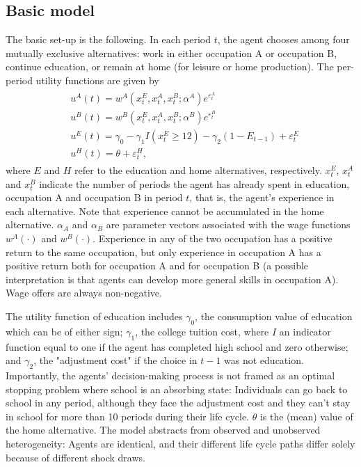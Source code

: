 \subsection{Basic model}

The basic set-up is the following. In each period $t$, the agent chooses among four mutually exclusive alternatives: work in either occupation A or occupation B, continue education, or remain at home (for leisure or home production). The per-period utility functions are given by
\begin{align} \label{eq:model-KW94}
\begin{split}
& u^A(t) = w^A(x^E_t, x^A_t, x^B_t; \alpha^A)e^{\varepsilon^A_t} \\
& u^B(t) = w^B(x^E_t, x^A_t, x^B_t;\alpha^B)e^{\varepsilon^B_t} \\
& u^E(t) = \gamma_0 - \gamma_1I(x^E_t \geq 12) - \gamma_2(1 - E_{t - 1}) + \varepsilon^E_t \\
& u^H(t) = \theta + \varepsilon^H_t,
\end{split}
\end{align}
where $E$ and $H$ refer to the education and home alternatives, respectively. $x^E_t$, $x^A_t$ and $x^B_t$ indicate the number of periods the agent has already spent in education, occupation A and occupation B in period $t$, that is, the agent's experience in each alternative. Note that experience cannot be accumulated in the home alternative. $\alpha_A$ and $\alpha_B$ are parameter vectors associated with the wage functions $w^A(\cdot)$ and $w^B(\cdot)$. Experience in any of the two occupation has a positive return to the same occupation, but only experience in occupation A has a positive return both for occupation A and for occupation B (a possible interpretation is that agents can develop more general skills in occupation A). Wage offers are always non-negative.

The utility function of education includes $\gamma_0$, the consumption value of education which can be of either sign; $\gamma_1$, the college tuition cost, where $I$ an indicator function equal to one if the agent has completed high school and zero otherwise; and $\gamma_2$, the "adjustment cost" if the choice in $t-1$ was not education. Importantly, the agents' decision-making process is not framed as an optimal stopping problem where school is an absorbing state: Individuals can go back to school in any period, although they face the adjustment cost and they can't stay in school for more than 10 periods during their life cycle. $\theta$ is the (mean) value of the home alternative. The model abstracts from observed and unobserved heterogeneity: Agents are identical, and their different life cycle paths differ solely because of different shock draws.

